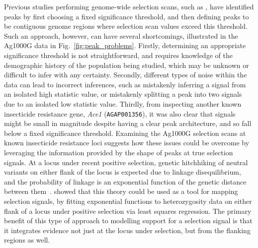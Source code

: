 \begin{refsection}
Previous studies performing genome-wide selection scans, such as \textcite{Garud2015}, have identified peaks by first choosing a fixed significance threshold, and then defining peaks to be contiguous genome regions where selection scan values exceed this threshold.
%
Such an approach, however, can have several shortcomings, illustrated in the Ag1000G data in Fig.~\ref{fig:peak_problems}.
%
Firstly, determining an appropriate significance threshold is not straightforward, and requires knowledge of the demographic history of the population being studied, which may be unknown or difficult to infer with any certainty.
%
Secondly, different types of noise within the data can lead to incorrect inferences, such as mistakenly inferring a signal from an isolated high statistic value, or mistakenly splitting a peak into two signals due to an isolated low statistic value.
%
Thirdly, from inspecting another known insecticide resistance gene, \textit{Ace1} (\texttt{AGAP001356}), it was also clear that signals might be small in magnitude despite having a clear peak architecture, and so fall below a fixed significance threshold.
%
Examining the Ag1000G selection scans at known insecticide resistance loci suggests how these issues could be overcome by leveraging the information provided by the shape of peaks at true selection signals.
%
At a locus under recent positive selection, genetic hitchhiking of neutral variants on either flank of the locus is expected due to linkage disequilibrium, and the probability of linkage is an exponential function of the genetic distance between them~\parencite{MaynardSmith1974}.
%
\textcite{Wiener2011} showed that this theory could be used as a tool for mapping selection signals, by fitting exponential functions to heterozygosity data on either flank of a locus under positive selection via least squares regression.
%
The primary benefit of this type of approach to modelling support for a selection signal is that it integrates evidence not just at the locus under selection, but from the flanking regions as well.
%



\end{refsection}
